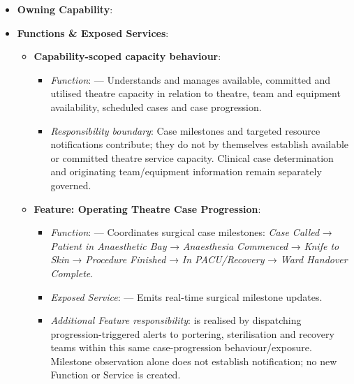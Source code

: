 \begin{itemize}

\item 
\textbf{Owning Capability}: \texttt{}



\item 
\textbf{Functions \& Exposed Services}:


\begin{itemize}

\item 
\textbf{Capability-scoped capacity behaviour}:


\begin{itemize}

\item 
\emph{Function}: \texttt{} — Understands and manages available, committed and utilised theatre capacity in relation to theatre, team and equipment availability, scheduled cases and case progression.



\item 
\emph{Responsibility boundary}: Case milestones and targeted resource notifications contribute; they do not by themselves establish available or committed theatre service capacity. Clinical case determination and originating team/\allowbreak{}equipment information remain separately governed.



\end{itemize}


\item 
\textbf{Feature: Operating Theatre Case Progression}:


\begin{itemize}

\item 
\emph{Function}: \texttt{} — Coordinates surgical case milestones: \emph{Case Called} → \emph{Patient in Anaesthetic Bay} → \emph{Anaesthesia Commenced} → \emph{Knife to Skin} → \emph{Procedure Finished} → \emph{In PACU/\allowbreak{}Recovery} → \emph{Ward Handover Complete}.



\item 
\emph{Exposed Service}: \texttt{} — Emits real-time surgical milestone updates.



\item 
\emph{Additional Feature responsibility}: \texttt{} is realised by dispatching progression-triggered alerts to portering, sterilisation and recovery teams within this same case-progression behaviour/\allowbreak{}exposure. Milestone observation alone does not establish notification; no new Function or Service is created.




\end{itemize}
\end{itemize}
\end{itemize}
